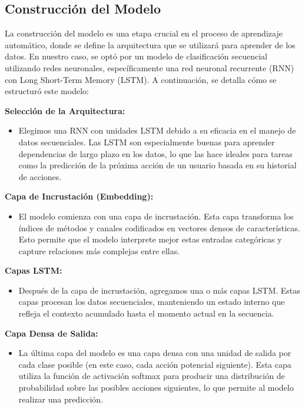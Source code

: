 \subsection{Construcción del Modelo}

La construcción del modelo es una etapa crucial en el proceso de aprendizaje automático, donde se define la arquitectura que se utilizará para aprender de los datos. En nuestro caso, se optó por un modelo de clasificación secuencial utilizando redes neuronales, específicamente una red neuronal recurrente (RNN) con Long Short-Term Memory (LSTM). A continuación, se detalla cómo se estructuró este modelo:

\textbf{Selección de la Arquitectura:} 
\begin{itemize}
    \item Elegimos una RNN con unidades LSTM debido a su eficacia en el manejo de datos secuenciales. Las LSTM son especialmente buenas para aprender dependencias de largo plazo en los datos, lo que las hace ideales para tareas como la predicción de la próxima acción de un usuario basada en su historial de acciones.
\end{itemize}

\textbf{Capa de Incrustación (Embedding):} 
\begin{itemize}
    \item El modelo comienza con una capa de incrustación. Esta capa transforma los índices de métodos y canales codificados en vectores densos de características. Esto permite que el modelo interprete mejor estas entradas categóricas y capture relaciones más complejas entre ellas.
\end{itemize}

\textbf{Capas LSTM:} 
\begin{itemize}
    \item Después de la capa de incrustación, agregamos una o más capas LSTM. Estas capas procesan los datos secuenciales, manteniendo un estado interno que refleja el contexto acumulado hasta el momento actual en la secuencia.
\end{itemize}

\textbf{Capa Densa de Salida:} 
\begin{itemize}
    \item La última capa del modelo es una capa densa con una unidad de salida por cada clase posible (en este caso, cada acción potencial siguiente). Esta capa utiliza la función de activación softmax para producir una distribución de probabilidad sobre las posibles acciones siguientes, lo que permite al modelo realizar una predicción.
\end{itemize}


